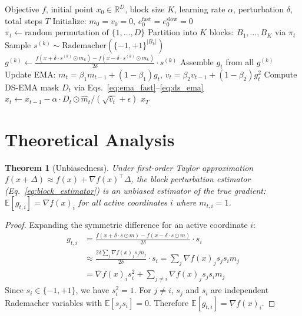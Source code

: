 \documentclass[10pt]{article}
\newtheorem{theorem}{Theorem}
\begin{document}
\begin{algorithm}[t]
\caption{Denoised Gradient Estimation (DGE)}
\label{alg:dge}
\begin{algorithmic}[1]
\REQUIRE Objective $f$, initial point $x_0 \in \mathbb{R}^D$, block size $K$, learning rate $\alpha$, perturbation $\delta$, total steps $T$
\STATE Initialize: $m_0 = v_0 = 0$, $e_0^{\text{fast}} = e_0^{\text{slow}} = 0$
    \STATE $\pi_t \gets \text{random permutation of } \{1, \ldots, D\}$
    \STATE Partition into $K$ blocks: $B_1, \ldots, B_K$ via $\pi_t$
        \STATE Sample $s^{(k)} \sim \text{Rademacher}(\{-1, +1\}^{|B_k|})$
        \STATE $g^{(k)} \gets \frac{f(x + \delta \cdot s^{(k)} \odot m_k) - f(x - \delta \cdot s^{(k)} \odot m_k)}{2\delta} \cdot s^{(k)}$
    \ENDFOR
    \STATE Assemble $g_t$ from all $g^{(k)}$
    \STATE Update EMA: $m_t = \beta_1 m_{t-1} + (1-\beta_1) g_t$, $v_t = \beta_2 v_{t-1} + (1-\beta_2) g_t^2$
    \STATE Compute DS-EMA mask $D_t$ via Eqs.~\ref{eq:ema_fast}--\ref{eq:ds_ema}
    \STATE $x_t \gets x_{t-1} - \alpha \cdot D_t \odot \hat{m}_t / (\sqrt{\hat{v}_t} + \epsilon)$
\ENDFOR
\RETURN $x_T$
\end{algorithmic}
\end{algorithm}

\section{Theoretical Analysis}
\label{sec:theory}

\begin{theorem}[Unbiasedness]
\label{thm:unbiased}
Under first-order Taylor approximation $f(x + \Delta) \approx f(x) + \nabla f(x)^\top \Delta$, the block perturbation estimator (Eq.~\ref{eq:block_estimator}) is an unbiased estimator of the true gradient: $\mathbb{E}[g_{t,i}] = \nabla f(x)_i$ for all active coordinates $i$ where $m_{t,i} = 1$.
\end{theorem}

\begin{proof}
Expanding the symmetric difference for an active coordinate $i$:
\begin{align*}
g_{t,i} &= \frac{f(x + \delta \cdot s \odot m) - f(x - \delta \cdot s \odot m)}{2\delta} \cdot s_i \\
&\approx \frac{2\delta \sum_j \nabla f(x)_j s_j m_j}{2\delta} \cdot s_i = \sum_j \nabla f(x)_j s_j s_i m_j \\
&= \nabla f(x)_i s_i^2 + \sum_{j \neq i} \nabla f(x)_j s_j s_i m_j
\end{align*}
Since $s_i \in \{-1, +1\}$, we have $s_i^2 = 1$. For $j \neq i$, $s_j$ and $s_i$ are independent Rademacher variables with $\mathbb{E}[s_j s_i] = 0$. Therefore $\mathbb{E}[g_{t,i}] = \nabla f(x)_i$.
\end{proof}
\end{document}
